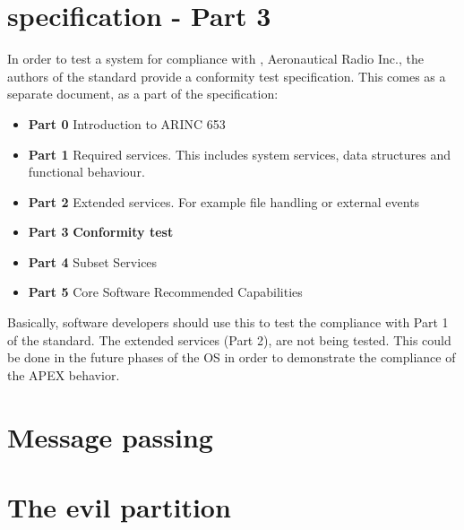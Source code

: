 \section{\arinc{} specification - Part 3}
In order to test a system for compliance with \arinc{}, Aeronautical
Radio Inc., the authors of the standard provide a conformity test
specification. This comes as a separate document, as a part of the
\arinc{} specification:
\begin{itemize}
	\item\textbf{Part 0} Introduction to ARINC 653
	\item\textbf{Part 1} Required services. This includes system services,
	data structures and functional behaviour.
	\item\textbf{Part 2} Extended services. For example file handling or external events
	\item\textbf{Part 3} \textbf{Conformity test}
	\item\textbf{Part 4} Subset Services
	\item\textbf{Part 5} Core Software Recommended Capabilities
\end{itemize}

Basically, software developers should use this to test the compliance with
Part 1 of the standard. The extended services (Part 2), are not being
tested. This could be done in the future phases of the \OSname{} OS in order
to demonstrate the compliance of the APEX behavior. 

\section{Message passing}

\section{The evil partition}